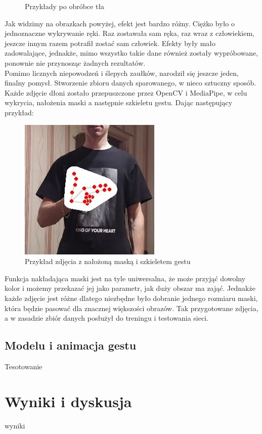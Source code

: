 \documentclass[12pt]{article}
\begin{document}
\begin{sloppypar}
{{\begin{figure}
\begin{subfigure}{.5\textwidth}
        \label{fig:blurred}
      \end{subfigure}
      \caption{Przykłady po obróbce tła}
      \label{fig:blurred-pre}
    \end{figure}
    Jak widzimy na obrazkach powyżej, efekt jest bardzo różny. Ciężko było o jednoznaczne wykrywanie ręki. 
    Raz zostawała sam ręka, raz wraz z człowiekiem, jeszcze innym razem potrafił zostać sam człowiek. 
    Efekty były mało zadowalające, jednakże, mimo wszystko takie dane również zostały wypróbowane, ponownie nie przynosząc żadnych rezultatów. \\
    Pomimo licznych niepowodzeń i ślepych zaułków, narodził się jeszcze jeden, finalny pomysł. Stworzenie zbioru danych sparowanego, w nieco sztuczny sposób.
    Każde zdjęcie dłoni zostało przepuszczone przez OpenCV i MediaPipe, w celu wykrycia, nałożenia maski a następnie szkieletu gestu. Dając następujący przykład:
    \begin{figure}[H]
      \centering
      \includegraphics{no_hand.jpg}
      \caption{Przykład zdjęcia z nałożoną maską i szkieletem gestu}
      \label{fig:mask}
    \end{figure}
    Funkcja nakładająca maski jest na tyle uniwersalna, że może przyjąć dowolny kolor i możemy przekazać jej jako parametr, jak duży obszar ma zająć. 
    Jednakże każde zdjęcie jest różne dlatego niezbędne było dobranie jednego rozmiaru maski, która będzie pasować dla znacznej większości obrazów. 
    Tak przygotowane zdjęcia, a w zasadzie zbiór danych posłużył do treningu i testowania sieci.
  }
  \subsection{Modelu i animacja gestu}
  {
    Tesotowanie
  }
}

\section{Wyniki i dyskusja}
{
  wyniki
}


\end{sloppypar}
\end{document}
